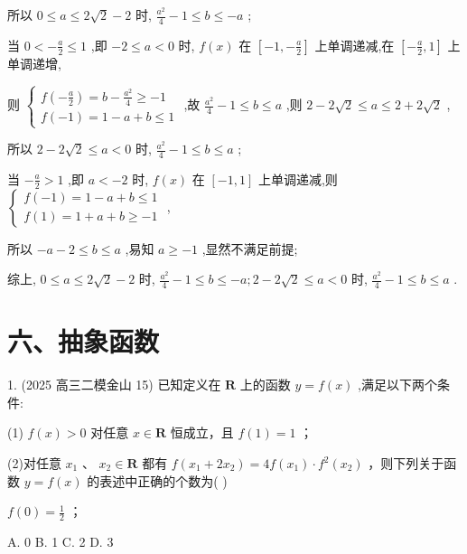 \documentclass[10pt]{article}
\newcommand*\circled[1]{\tikz[baseline=(char.base)]{\node[shape=circle,draw,inner sep=1.5pt] (char) {\small #1};}}
\begin{document}
所以 \(0 \leq  a \leq  2\sqrt{2} - 2\) 时, \(\frac{{a}^{2}}{4} - 1 \leq  b \leq   - a\) ;

当 \(0 <  - \frac{a}{2} \leq  1\) ,即 \(- 2 \leq  a < 0\) 时, \(f\left( x\right)\) 在 \(\left\lbrack  {-1, - \frac{a}{2}}\right\rbrack\) 上单调递减,在 \(\left\lbrack  {-\frac{a}{2},1}\right\rbrack\) 上单调递增,

则 \(\left\{  \begin{array}{l} f\left( {-\frac{a}{2}}\right)  = b - \frac{{a}^{2}}{4} \geq   - 1 \\  f\left( {-1}\right)  = 1 - a + b \leq  1 \end{array}\right.\) ,故 \(\frac{{a}^{2}}{4} - 1 \leq  b \leq  a\) ,则 \(2 - 2\sqrt{2} \leq  a \leq  2 + 2\sqrt{2}\) ,

所以 \(2 - 2\sqrt{2} \leq  a < 0\) 时, \(\frac{{a}^{2}}{4} - 1 \leq  b \leq  a\) ;

当 \(- \frac{a}{2} > 1\) ,即 \(a <  - 2\) 时, \(f\left( x\right)\) 在 \(\left\lbrack  {-1,1}\right\rbrack\) 上单调递减,则 \(\left\{  \begin{array}{l} f\left( {-1}\right)  = 1 - a + b \leq  1 \\  f\left( 1\right)  = 1 + a + b \geq   - 1 \end{array}\right.\) ,

所以 \(- a - 2 \leq  b \leq  a\) ,易知 \(a \geq   - 1\) ,显然不满足前提;

综上, \(0 \leq  a \leq  2\sqrt{2} - 2\) 时, \(\frac{{a}^{2}}{4} - 1 \leq  b \leq   - a;2 - 2\sqrt{2} \leq  a < 0\) 时, \(\frac{{a}^{2}}{4} - 1 \leq  b \leq  a\) .

\section*{六、抽象函数}

1. (2025 高三二模金山 15) 已知定义在 \(\mathbf{R}\) 上的函数 \(y = f\left( x\right)\) ,满足以下两个条件:

(1) \(f\left( x\right)  > 0\) 对任意 \(x \in  \mathbf{R}\) 恒成立，且 \(f\left( 1\right)  = 1\) ；

(2)对任意 \({x}_{1}\text{ 、 }{x}_{2} \in  \mathbf{R}\) 都有 \(f\left( {{x}_{1} + 2{x}_{2}}\right)  = {4f}\left( {x}_{1}\right)  \cdot  {f}^{2}\left( {x}_{2}\right)\) ，则下列关于函数 \(y = f\left( x\right)\) 的表述中正确的个数为( )

 \circled{1}  \(f\left( 0\right)  = \frac{1}{2}\) ；

A. 0 B. 1 C. 2 D. 3
\end{document}
